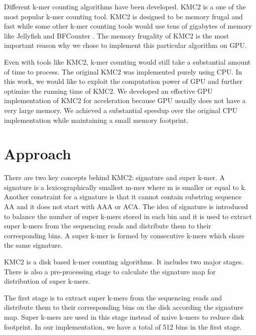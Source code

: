\documentclass{bioinfo}
\begin{document}
Different k-mer counting algorithms have been developed.
KMC2 \citep{Seb14} is a one of the most popular k-mer counting tool. KMC2 is designed to be memory frugal and fast while some other k-mer counting tools would use tens of gigabytes of memory like Jellyfish \citep{Mar11} and BFCounter \citep{Mel11}. 
The memory frugality of KMC2 is the most important reason why we chose to implement this particular algorithm on GPU. 

Even with tools like KMC2, k-mer counting would still take a substantial amount of time to process. The original KMC2 was implemented purely using CPU. 
In this work, we would like to exploit the computation power of GPU and further optimize the running time of KMC2. We developed an effective GPU implementation of KMC2 for acceleration because GPU usually does not have a very large memory. 
We achieved a substantial speedup over the original CPU implementation while maintaining a small memory footprint.

\section{Approach}

There are two key concepts behind KMC2: signature and super k-mer.
A signature is a lexicographically smallest m-mer where m is smaller or equal to k. Another constraint for a signature is that it cannot contain substring sequence AA and it does not start with AAA or ACA.
The idea of signature is introduced to balance the number of super k-mers stored in each bin and it is used to extract super k-mers from the sequencing reads and distribute them to their corresponding bins.
A super k-mer is formed by consecutive k-mers which share the same signature.

KMC2 is a disk based k-mer counting algorithms. It includes two major stages. There is also a pre-processing stage to calculate the signature map for distribution of super k-mers.

The first stage is to extract super k-mers from the sequencing reads and distribute them to their corresponding bins on the disk according the signature map. 
Super k-mers are used in this stage instead of naive k-mers to reduce disk footprint.
In our implementation, we have a total of 512 bins in the first stage.
\end{document}
